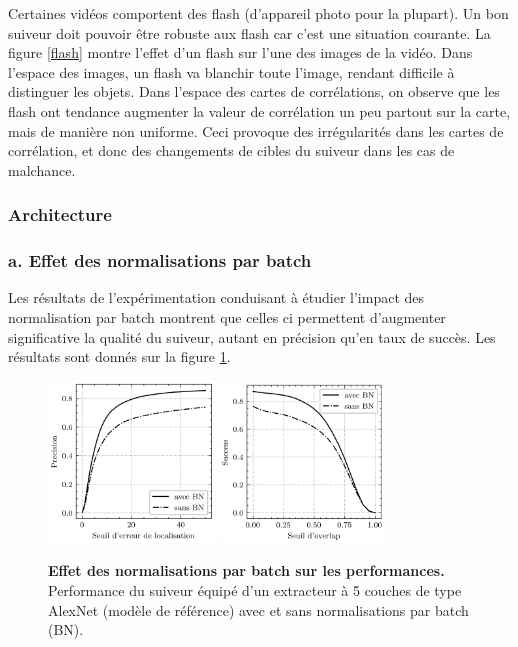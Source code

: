 \documentclass[10pt,twocolumn,letterpaper,french]{article}
\begin{document}
Certaines vidéos comportent des flash (d'appareil photo pour la plupart). Un bon suiveur doit pouvoir être robuste aux flash car c'est une situation courante. La figure \ref{flash} montre l'effet d'un flash sur l'une des images de la vidéo. Dans l'espace des images, un flash va blanchir toute l'image, rendant difficile à distinguer les objets. Dans l'espace des cartes de corrélations, on observe que les flash ont tendance augmenter la valeur de corrélation un peu partout sur la carte, mais de manière non uniforme. Ceci provoque des  irrégularités dans les cartes de corrélation, et donc des changements de cibles du suiveur dans les cas de malchance.


\subsubsection*{Architecture}

\subsubsection*{a. Effet des normalisations par batch}

Les résultats de l'expérimentation conduisant à étudier l'impact des normalisation par batch montrent que celles ci permettent d'augmenter significative la qualité du suiveur, autant en précision qu'en taux de succès. Les résultats sont donnés sur la figure \ref{courbes_BN}.


\begin{figure}[h!]
\centering
\includegraphics[width=125pt]{images/BN/courbes_pre.png} 
\includegraphics[width=125pt]{images/BN/courbes_succ.png} 
\caption{\textbf{Effet des normalisations par batch sur les performances.} Performance du suiveur équipé d'un extracteur à 5 couches de type AlexNet (modèle de référence) avec et sans normalisations par batch (BN).}
\label{courbes_BN}
\end{figure}
\end{document}
